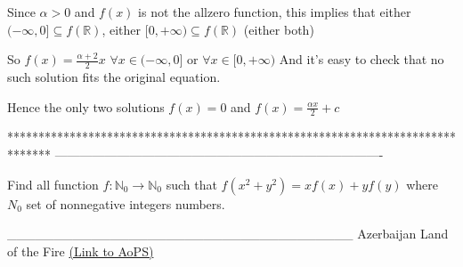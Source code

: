 \begin{solution}
Since $\alpha >0$ and $f(x)$ is not the allzero function, this implies that either $(-\infty,0]\subseteq f(\mathbb R)$, either $[0,+\infty)\subseteq f(\mathbb R)$ (either both)

So $f(x)=\frac{\alpha+2}2x$ $\forall x\in (-\infty,0]$ or $\forall x\in [0,+\infty)$
And it's easy to check that no such solution fits the original equation.

Hence the only two solutions $f(x)=0$ and $f(x)=\frac{\alpha x}2+c$
\end{solution}
*******************************************************************************
-------------------------------------------------------------------------------

\begin{problem}
	Find all function ${{f: \mathbb{N}_0}\to\mathbb{N}_0}$ such that $f(x^2+y^2)=xf(x)+yf(y)$
where $N_0$ set of nonnegative integers numbers.

_____________________________________
Azerbaijan Land of the Fire 
	\flushright \href{https://artofproblemsolving.com/community/c6h527781}{(Link to AoPS)}
\end{problem}



